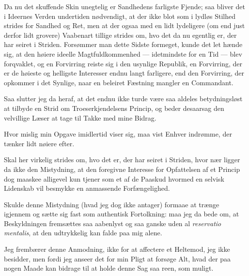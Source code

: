 \documentclass[12pt,a4paper]{book}
\begin{document}
Da nu det skuffende Skin unegtelig er Sandhedens farligste Fjende; saa bliver
det i Ideernes Verden undertiden nødvendigt, at der ikke blot som i lydløs
Stilhed strides for Sandhed og Ret, men at der ogsaa med en lidt lydeligere (om
end just derfor lidt grovere) Vaabenart tillige strides om, hvo det da nu
egentlig er, der har seiret i Striden. Forsømmer man dette Sidste formeget,
kunde det let hænde sig, at den høiere ideelle Magtfuldkommenhed ---
idetmindste for en Tid --- blev forqvaklet, og en Forvirring reiste sig i den
usynlige Republik, en Forvirring, der er de høieste og helligste Interesser
endnu langt farligere, end den Forvirring, der opkommer i det Synlige, naar en
beleiret Fæstning mangler en Commandant.

Saa slutter jeg da heraf, at det endnu ikke turde være saa aldeles
betydningsløst at tilbyde en Strid om Troeserkjendelsens Princip, og beder
desaarsag den velvillige Læser at tage til Takke med mine Bidrag.

Hvor mislig min Opgave imidlertid viser sig, maa vist Enhver indrømme, der
tænker lidt nøiere efter.

Skal her virkelig strides om, hvo det er, der har
seiret i Striden, hvor nær ligger da ikke den Mistydning, at den foregivne
Interesse for Opfattelsen af et Princip dog maaskee alligevel kun tjener som et
af de Paaskud hvormed en selvisk Lidenskab vil besmykke en anmassende
Forfængelighed.

Skulde denne Mistydning (hvad jeg dog ikke antager) formaae at trænge igjennem
og sætte sig fast som authentisk Fortolkning: maa jeg da bede om, at
Beskyldningen fremsættes saa aabenlyst og saa ganske uden al
\textit{reservatio mentalis}, at den udtrykkelig kan falde paa mig alene.

Jeg frembærer denne Anmodning, ikke for at affectere et Heltemod, jeg ikke
besidder, men fordi jeg anseer det for min Pligt at forsøge Alt, hvad der paa
nogen Maade kan bidrage til at holde denne Sag saa reen, som muligt.
\end{document}
